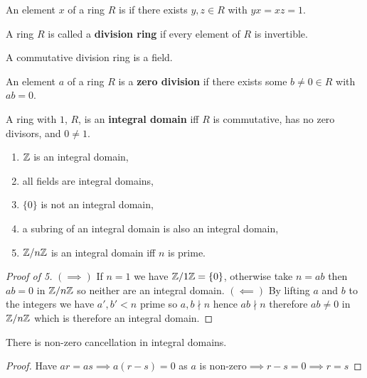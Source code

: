 \documentclass{report}
\begin{document}
\begin{definition}[Invertible]
    An element $x$ of a ring $R$ is  if there exists $y,z\in R$ with $yx=xz=1$.
\end{definition}

\begin{definition}
    A ring $R$ is called a \textbf{division ring} if every element of $R$ is invertible.
\end{definition}

\begin{remark}
    A commutative division ring is a field.
\end{remark}

\begin{definition}
    An element $a$ of a ring $R$ is a \textbf{zero division} if there exists some $b\neq0\in R$ with $ab=0$.
\end{definition}

\begin{definition}
    A ring with $1$, $R$, is an \textbf{integral domain} iff $R$ is commutative, has no zero divisors, and $0\neq 1$.
\end{definition}

\begin{examples}
    \begin{enumerate}
        \item $\mathbb{Z}$ is an integral domain,
        \item all fields are integral domains,
        \item $\{0\}$ is not an integral domain,
        \item a subring of an integral domain is also an integral domain,
        \item $\mathbb{Z}/n\mathbb{Z}$ is an integral domain iff $n$ is prime.
    \end{enumerate}
    \begin{proof}[Proof of 5] $(\implies)$ If $n=1$ we have $\mathbb{Z}/1\mathbb{Z}=\{0\}$, otherwise take $n=ab$ then $ab=0$ in $\mathbb{Z}/n\mathbb{Z}$ so neither are an integral domain. $(\impliedby)$ By lifting $a$ and $b$ to the integers we have $a',b'<n$ prime so $a,b\nmid n$ hence $ab\nmid n$ therefore $ab\neq 0$ in $\mathbb{Z}/n\mathbb{Z}$ which is therefore an integral domain.
    \end{proof}
\end{examples}

\begin{proposition}
    There is non-zero cancellation in integral domains. \begin{proof}
        Have $ar=as\implies a(r-s)=0 $ as $a$ is non-zero$ \implies r-s=0\implies r=s$
    \end{proof}
\end{proposition}
\end{document}

